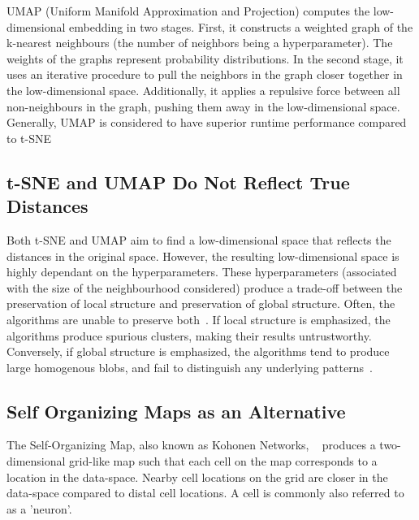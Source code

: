 UMAP (Uniform Manifold Approximation and Projection) computes the low-dimensional embedding in two stages. First, it constructs a weighted graph of the k-nearest neighbours (the number of neighbors being a hyperparameter). The weights of the graphs represent probability distributions. In the second stage, it uses an iterative procedure to pull the neighbors in the graph closer together in the low-dimensional space. Additionally, it applies a repulsive force between all non-neighbours in the graph, pushing them away in the low-dimensional space. Generally, UMAP is considered to have superior runtime performance compared to t-SNE~\cite{mcinnes2020umap}

\subsection*{t-SNE and UMAP Do Not Reflect True Distances}


Both t-SNE and UMAP aim to find a low-dimensional space that reflects the distances in the original space. However, the resulting low-dimensional space is highly dependant on the hyperparameters. These hyperparameters (associated with the size of the neighbourhood considered) produce a trade-off between the preservation of local structure and preservation of global structure. Often, the algorithms are unable to preserve both~\cite{pacmap}. If local structure is emphasized, the algorithms produce spurious clusters, making their results untrustworthy. Conversely, if global structure is emphasized, the algorithms tend to produce large homogenous blobs, and fail to distinguish any underlying patterns~\cite{leiQuantifyingImpactUninformative2023}.


\subsection*{Self Organizing Maps as an Alternative}

The Self-Organizing Map, also known as Kohonen Networks, ~\cite{kohonen1990self} produces a two-dimensional grid-like map such that each cell on the map corresponds to a location in the data-space. Nearby cell locations on the grid are closer in the data-space compared to distal cell locations. A cell is commonly also referred to as a 'neuron'.

